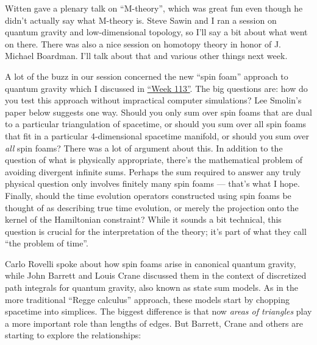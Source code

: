 \documentclass{article}
\renewcommand{\texttt}[1]{%
  \begingroup
  \ttfamily
  \begingroup\lccode`~=`/\lowercase{\endgroup\def~}{/\discretionary{}{}{}}%
  \begingroup\lccode`~=`[\lowercase{\endgroup\def~}{[\discretionary{}{}{}}%
  \begingroup\lccode`~=`.\lowercase{\endgroup\def~}{.\discretionary{}{}{}}%
  \catcode`/=\active\catcode`[=\active\catcode`.=\active
  \scantokens{#1\noexpand}%
  \endgroup
}
\begin{document}
Witten gave a plenary talk on ``M-theory'', which was great fun even
though he didn't actually say what M-theory is. Steve Sawin and I ran a
session on quantum gravity and low-dimensional topology, so I'll say a
bit about what went on there. There was also a nice session on homotopy
theory in honor of J. Michael Boardman. I'll talk about that and various
other things next week.

A lot of the buzz in our session concerned the new ``spin foam''
approach to quantum gravity which I discussed in
\protect\hyperlink{week113}{``Week 113''}. The big questions are: how do
you test this approach without impractical computer simulations? Lee
Smolin's paper below suggests one way. Should you only sum over spin
foams that are dual to a particular triangulation of spacetime, or
should you sum over all spin foams that fit in a particular
4-dimensional spacetime manifold, or should you sum over \emph{all} spin
foams? There was a lot of argument about this. In addition to the
question of what is physically appropriate, there's the mathematical
problem of avoiding divergent infinite sums. Perhaps the sum required to
answer any truly physical question only involves finitely many spin
foams --- that's what I hope. Finally, should the time evolution
operators constructed using spin foams be thought of as describing true
time evolution, or merely the projection onto the kernel of the
Hamiltonian constraint? While it sounds a bit technical, this question
is crucial for the interpretation of the theory; it's part of what they
call ``the problem of time''.

Carlo Rovelli spoke about how spin foams arise in canonical quantum
gravity, while John Barrett and Louis Crane discussed them in the
context of discretized path integrals for quantum gravity, also known as
state sum models. As in the more traditional ``Regge calculus''
approach, these models start by chopping spacetime into simplices. The
biggest difference is that now \emph{areas of triangles} play a more
important role than lengths of edges. But Barrett, Crane and others are
starting to explore the relationships:

\end{document}
